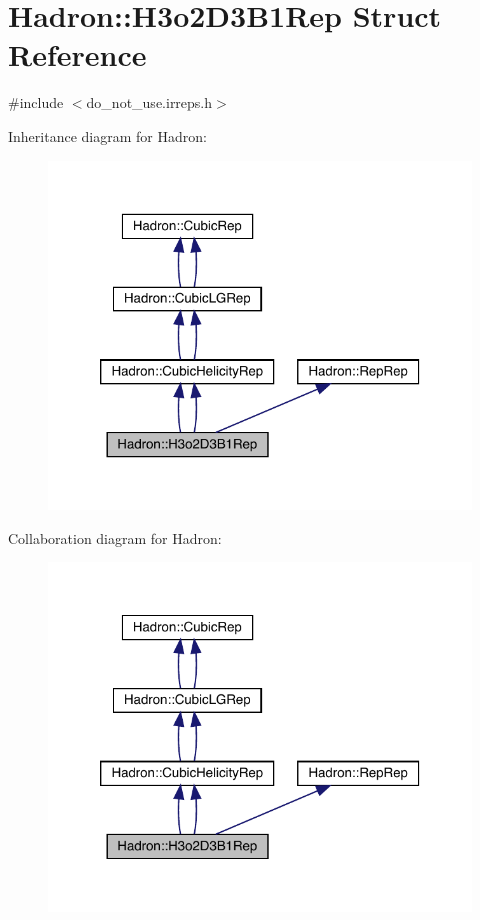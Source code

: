\hypertarget{structHadron_1_1H3o2D3B1Rep}{}\section{Hadron\+:\+:H3o2\+D3\+B1\+Rep Struct Reference}
\label{structHadron_1_1H3o2D3B1Rep}


{\ttfamily \#include $<$do\+\_\+not\+\_\+use.\+irreps.\+h$>$}



Inheritance diagram for Hadron\+:\nopagebreak
\begin{figure}[H]
\begin{center}
\leavevmode
\includegraphics[width=320pt]{d0/df9/structHadron_1_1H3o2D3B1Rep__inherit__graph}
\end{center}
\end{figure}


Collaboration diagram for Hadron\+:\nopagebreak
\begin{figure}[H]
\begin{center}
\leavevmode
\includegraphics[width=320pt]{d2/d05/structHadron_1_1H3o2D3B1Rep__coll__graph}
\end{center}
\end{figure}
